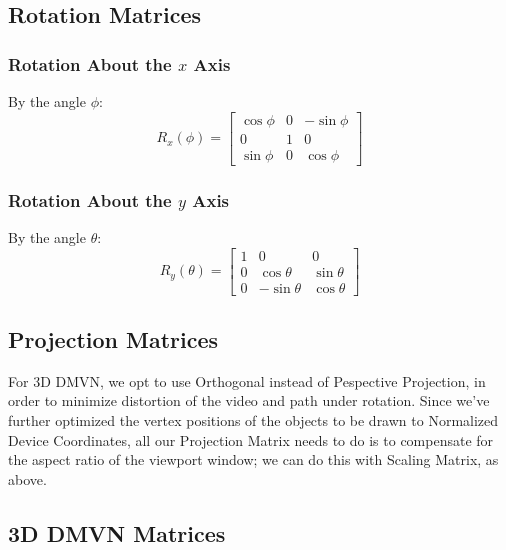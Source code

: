 \subsection{Rotation Matrices}

\subsubsection{Rotation About the $x$ Axis}
By the angle $\phi$:
\begin{equation}
R_x(\phi) =
\begin{bmatrix}
    \cos\phi & 0 & -\sin\phi \\
    0 & 1 & 0 \\
    \sin\phi & 0 & \cos\phi
\end{bmatrix}
\end{equation}

\subsubsection{Rotation About the $y$ Axis}
By the angle $\theta$:
\begin{equation}
R_y(\theta) =
\begin{bmatrix}
    1 & 0 & 0 \\
    0 & \cos\theta & \sin\theta \\
    0 & -\sin\theta & \cos\theta
\end{bmatrix}
\end{equation}

\subsection{Projection Matrices}
For 3D DMVN, we opt to use Orthogonal instead of Pespective Projection, in order to minimize distortion of the video and path under rotation. Since we've further optimized the vertex positions of the objects to be drawn to Normalized Device Coordinates, all our Projection Matrix needs to do is to compensate for the aspect ratio of the viewport window; we can do this with Scaling Matrix, as above.

\subsection{3D DMVN Matrices}
